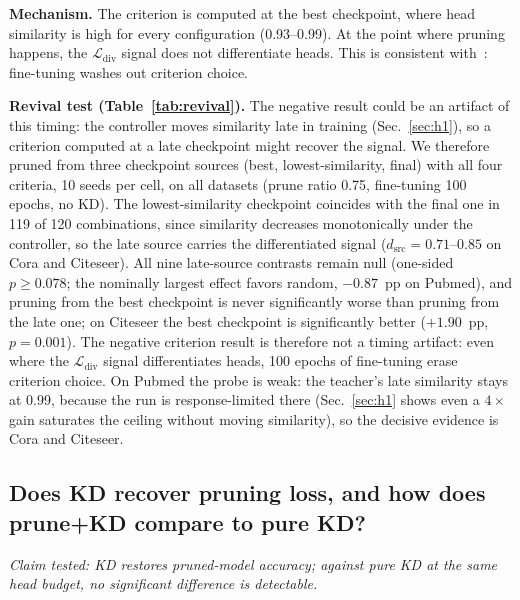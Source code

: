 \documentclass{ws-ijprai}
\newcommand{\Ldiv}{\mathcal{L}_{\mathrm{div}}}
\begin{document}


\noindent\textbf{Mechanism.} The criterion is computed at the best checkpoint,
where head similarity is high for every configuration (0.93--0.99). At the
point where pruning happens, the $\Ldiv$ signal does not differentiate heads.
This is consistent with~\cite{michel2019}: fine-tuning washes out criterion
choice.

\noindent\textbf{Revival test (Table~\ref{tab:revival}).} The negative result
could be an artifact of this timing: the controller moves similarity late in
training (Sec.~\ref{sec:h1}), so a criterion computed at a late checkpoint
might recover the signal. We therefore pruned from three checkpoint sources
(best, lowest-similarity, final) with all four criteria, 10 seeds per cell, on
all datasets (prune ratio 0.75, fine-tuning 100 epochs, no KD). The
lowest-similarity checkpoint coincides with the final one in 119 of 120
combinations, since similarity decreases monotonically under the controller,
so the late source carries the differentiated signal ($d_{\mathrm{src}} =
0.71$--$0.85$ on Cora and Citeseer). All nine late-source contrasts remain
null (one-sided $p \ge 0.078$; the nominally largest effect favors random,
$-0.87$~pp on Pubmed), and pruning from the best checkpoint is never
significantly worse than pruning from the late one; on Citeseer the best
checkpoint is significantly better ($+1.90$~pp, $p=0.001$). The negative
criterion result is therefore not a timing artifact: even where the $\Ldiv$
signal differentiates heads, 100 epochs of fine-tuning erase criterion
choice. On Pubmed the probe is weak: the teacher's late similarity stays
at 0.99, because the run is response-limited there (Sec.~\ref{sec:h1}
shows even a $4\times$ gain saturates the ceiling without moving
similarity), so the decisive evidence is Cora and Citeseer.



\subsection{Does KD recover pruning loss, and how does prune+KD compare to pure KD?}
\label{sec:h3}

\emph{Claim tested: KD restores pruned-model accuracy; against pure KD at the
same head budget, no significant difference is detectable.}
\end{document}
